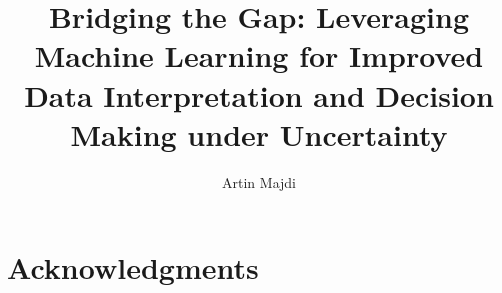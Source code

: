 \author{Artin Majdi}
\title{Bridging the Gap: Leveraging Machine Learning for Improved Data Interpretation and Decision Making under Uncertainty}


\fancyhf{}
\cfoot{\thepage}
\chead{\th}

\maketitle%

\chapter*{Acknowledgments}


%
\tableofcontents
\listoffigures
\newpage
\listoftables
\newpage

